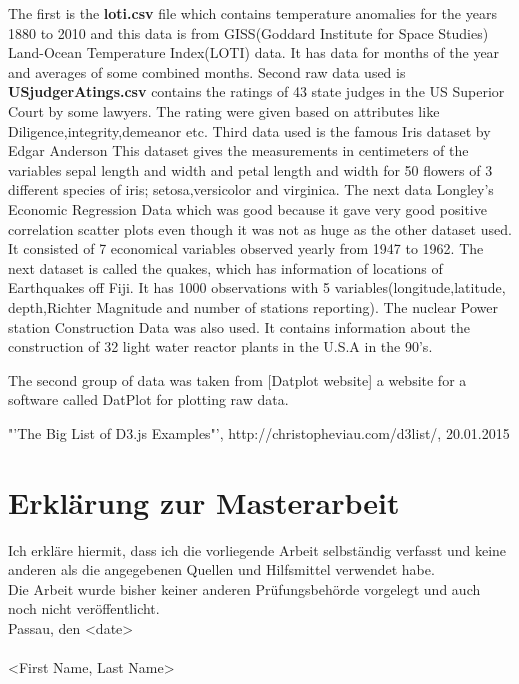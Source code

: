 \documentclass[12pt, a4paper,oneside]{report}
\begin{document}
The first is the \textbf{loti.csv} file which contains temperature anomalies for the years 1880 to 2010 and this data is from GISS(Goddard Institute for Space Studies) Land-Ocean
Temperature Index(LOTI) data. It has data for months of the year and averages of some combined months.
Second raw data used is \textbf{USjudgerAtings.csv} contains the ratings of 43 state judges in the US Superior Court by some lawyers. The rating were given based on attributes like Diligence,integrity,demeanor etc.
Third data used is the famous Iris dataset by Edgar Anderson
This dataset gives the measurements in centimeters of the variables sepal length and width and petal length and width for 50 flowers of 3 different species of iris; setosa,versicolor and virginica. 
The next data Longley's Economic Regression Data which was good because it gave very good positive correlation scatter plots even though it was not as huge as the other dataset used. It
consisted of 7 economical variables observed yearly from 1947 to 1962.
The next dataset is called the quakes, which has information of locations of Earthquakes off Fiji. It has 1000 observations with 5 variables(longitude,latitude, depth,Richter Magnitude and number of stations reporting).
The nuclear Power station Construction Data was also used. It contains information about the construction of 32 light water reactor plants in the U.S.A  in the 90's.

The second group of data was taken from [Datplot website] a website for a software called DatPlot for plotting raw data.












\begin{thebibliography}{12345678}
 "'The Big List of D3.js Examples"', http://christopheviau.com/d3list/, 20.01.2015






\end{thebibliography}

\newpage
\chapter*{Erklärung zur Masterarbeit}
Ich erkläre hiermit, dass ich die vorliegende Arbeit selbständig verfasst und keine anderen als die angegebenen Quellen und Hilfsmittel verwendet habe. \newline
\ \\
Die Arbeit wurde bisher keiner anderen Prüfungsbehörde vorgelegt und auch noch nicht veröffentlicht.\newline
\ \\
Passau, den <date>
\newline
\ \\
\ \\
<First Name, Last Name>
\end{document}
